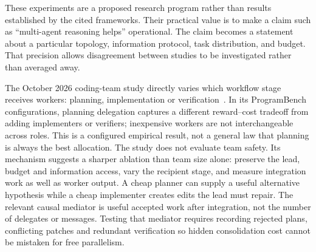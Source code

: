 These experiments are a proposed research program rather than results established by the cited frameworks. Their practical value is to make a claim such as ``multi-agent reasoning helps'' operational. The claim becomes a statement about a particular topology, information protocol, task distribution, and budget. That precision allows disagreement between studies to be investigated rather than averaged away.

The October 2026 coding-team study directly varies which workflow stage receives workers: planning, implementation or verification~\cite{samway2026codingteams}. In its ProgramBench configurations, planning delegation captures a different reward--cost tradeoff from adding implementers or verifiers; inexpensive workers are not interchangeable across roles. This is a configured empirical result, not a general law that planning is always the best allocation. The study does not evaluate team safety. Its mechanism suggests a sharper ablation than team size alone: preserve the lead, budget and information access, vary the recipient stage, and measure integration work as well as worker output. A cheap planner can supply a useful alternative hypothesis while a cheap implementer creates edits the lead must repair. The relevant causal mediator is useful accepted work after integration, not the number of delegates or messages. Testing that mediator requires recording rejected plans, conflicting patches and redundant verification so hidden consolidation cost cannot be mistaken for free parallelism.

